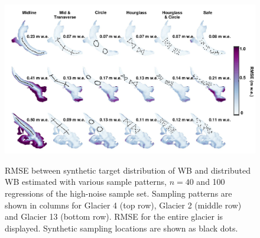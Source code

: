 \documentclass[twocolumn,letterpaper]{igs}
\begin{document}
\begin{figure}
	\centering
	\includegraphics[width =\textwidth]{SynObsRMSEmap.pdf}\\
	\caption{RMSE between synthetic target distribution of WB and distributed WB estimated with various sample patterns, $n=40$ and 100 regressions of the high-noise sample set. Sampling patterns are shown in columns for Glacier 4 (top row), Glacier 2 (middle row) and Glacier 13 (bottom row). RMSE for the entire glacier is displayed. Synthetic sampling locations are shown as black dots.}
	\label{fig:SynObsRMSEmap}
\end{figure}
\end{document}
